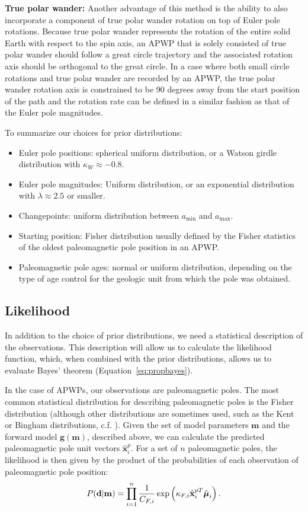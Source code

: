\documentclass[11pt,letterpaper]{article}
\newcommand{\mitbf}[1]{\hbox{\mathversion{bold}$#1$}}
\begin{document}
\textbf{True polar wander:}
Another advantage of this method is the ability to also incorporate a component of true polar wander rotation on top of Euler pole rotations. Because true polar wander represents the rotation of the entire solid Earth with respect to the spin axis, an APWP that is solely consisted of true polar wander should follow a great circle trajectory and the associated rotation axis should be orthogonal to the great circle. In a case where both small circle rotations and true polar wander are recorded by an APWP, the true polar wander rotation axis is constrained to be 90 degrees away from the start position of the path and the rotation rate can be defined in a similar fashion as that of the Euler pole magnitudes.


To summarize our choices for prior distributions:
\begin{itemize}
\item Euler pole positions: spherical uniform distribution, or a Watson girdle distribution with $\kappa_W \approx -0.8$.
\item Euler pole magnitudes: Uniform distribution, or an exponential distribution with $\lambda \approx 2.5$ or smaller.
\item Changepoints: uniform distribution between $a_\mathrm{min}$ and $a_\mathrm{max}$.
\item Starting position: Fisher distribution usually defined by the Fisher statistics of the oldest paleomagnetic pole position in an APWP.
\item Paleomagnetic pole ages: normal or uniform distribution, depending on the type of age control for the geologic unit from which the pole was obtained.
\end{itemize}

\subsection*{Likelihood}
\label{sec:likelihood}
In addition to the choice of prior distributions, we need a statistical description of the observations. This description will allow us to calculate the likelihood function, which, when combined with the prior distributions, allows us to evaluate Bayes' theorem (Equation~\eqref{eq:propbayes}).

In the case of APWPs, our observations are paleomagnetic poles. The most common statistical distribution for describing paleomagnetic poles is the Fisher distribution (although other distributions are sometimes used, such as the Kent or Bingham distributions, c.f. \citealp{Tauxe2010a}). Given the set of model parameters $\mathbf{m}$ and the forward model $\mathbf{g}(\mathbf{m})$, described above, we can calculate the predicted paleomagnetic pole unit vectors $\hat{\mathbf{x}}_i^p$. For a set of $n$ paleomagnetic poles, the likelihood is then given by the product of the probabilities of each observation of paleomagnetic pole position:
\begin{equation}
P(\mathbf{d} \vert \mathbf{m}) = \displaystyle\prod_{i=1}^n \frac{1}{C_{F,i}} \exp \left( \kappa_{F,i} \hat{\mathbf{x}}_{i}^{pT} \hat{\mitbf{\mu}}_i \right).
\label{eq:model_likelihood}
\end{equation}
\end{document}
